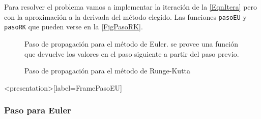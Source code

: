 
Para resolver el problema vamos a implementar la iteración de la \autoref{EqnItera}
pero con la aproximación a la derivada del método elegido. 
Las funciones \texttt{pasoEU} y \texttt{pasoRK} que pueden verse
en la \autoref{FigPasoRK}.

\begin{figure}[H]
  \caption{\protect\label{FigPasoEu} 
  Paso de propagación para el método de Euler. se provee una función que devuelve los valores en el paso
  siguiente a partir del paso previo.}
\end{figure}

\begin{figure}


  \caption{\protect\label{FigPasoRK}
  Paso de propagación para el método de Runge-Kutta
  }
\end{figure}

\mode*

\begin{frame}<presentation>[label=FramePasoEU]
  \frametitle{Paso para Euler}
    \center

    \begin{codeblock}
      

    \end{codeblock}

\end{frame}

